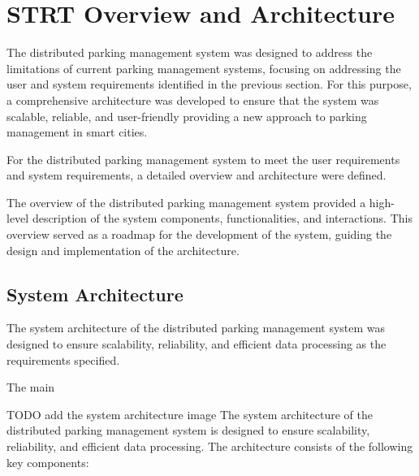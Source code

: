 \documentclass[oneside, 12pt, a4paper, draft]{book}
\begin{document}
\chapter{{\bfseries\sffamily STRT} Overview and Architecture}
\label{sec:org499902e}
The distributed parking management system was designed to address the limitations of current parking management systems, focusing on addressing the user and system requirements identified in the previous section.
For this purpose, a comprehensive architecture was developed to ensure that the system was scalable, reliable, and user-friendly providing a new approach to parking management in smart cities.

For the distributed parking management system to meet the user requirements and system requirements, a detailed overview and architecture were defined.

The overview of the distributed parking management system provided a high-level description of the system components, functionalities, and interactions.
This overview served as a roadmap for the development of the system, guiding the design and implementation of the architecture.
\section{System Architecture}
\label{sec:org97f05bf}
The system architecture of the distributed parking management system was designed to ensure scalability, reliability, and efficient data processing as the requirements specified.


The main

TODO add the system architecture image
The system architecture of the distributed parking management system is designed to ensure scalability, reliability, and efficient data processing. The architecture consists of the following key components:
\end{document}

